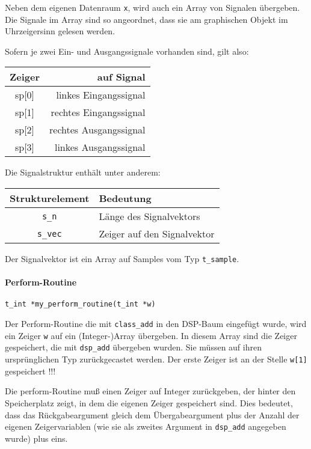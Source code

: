 \documentclass[12pt, a4paper,austrian, titlepage]{article}
\begin{document}
\begin{appendix}
Neben dem eigenen Datenraum \verb+x+, wird auch ein Array von Signalen übergeben.
Die Signale im Array sind so angeordnet, dass sie am graphischen Objekt
im Uhrzeigersinn gelesen werden.

Sofern je zwei Ein- und Ausgangssignale vorhanden sind, gilt also:

\begin{tabular}{c|r}
Zeiger & auf Signal \\
\hline\hline
sp[0] & linkes Eingangssignal \\
sp[1] & rechtes Eingangssignal \\
sp[2] & rechtes Ausgangssignal \\
sp[3] & linkes Ausgangssignal \\
\end{tabular}

Die Signalstruktur enthält unter anderem:

\begin{tabular}{c|l}
Strukturelement & Bedeutung \\
\hline
\verb+s_n+ & Länge des Signalvektors \\
\verb+s_vec+ & Zeiger auf den Signalvektor \\
\end{tabular}

Der Signalvektor ist ein Array auf Samples vom Typ \verb+t_sample+.

\paragraph{Perform-Routine}
\begin{verbatim}
t_int *my_perform_routine(t_int *w)
\end{verbatim}

Der Perform-Routine die mit \verb+class_add+ in den DSP-Baum eingefügt wurde,
wird ein Zeiger \verb+w+ auf ein (Integer-)Array übergeben.
In diesem Array sind die Zeiger gespeichert, die mit \verb+dsp_add+ übergeben wurden.
Sie müssen auf ihren ursprünglichen Typ zurückgecastet werden.
Der erste Zeiger ist an der Stelle \verb+w[1]+ gespeichert !!!

Die perform-Routine muß einen Zeiger auf Integer zurückgeben, der hinter den
Speicherplatz zeigt, in dem die eigenen Zeiger gespeichert sind.
Dies bedeutet, dass das Rückgabeargument gleich dem Übergabeargument plus der
Anzahl der eigenen Zeigervariablen (wie sie als zweites Argument in
\verb+dsp_add+ angegeben wurde) plus eins.





\end{appendix}
\end{document}
